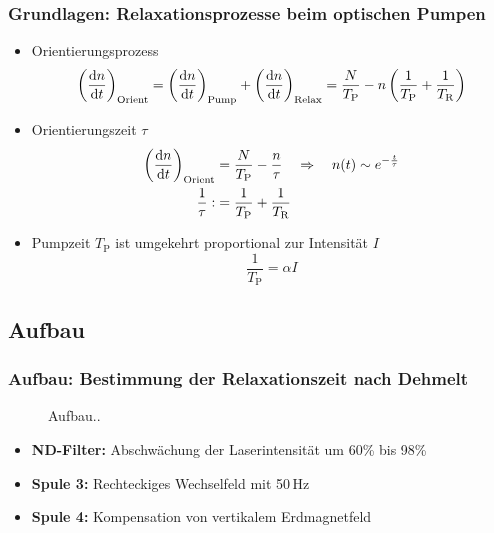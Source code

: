 \begin{frame}
\frametitle{Grundlagen: Relaxationsprozesse beim optischen Pumpen}
\begin{itemize}[<+->]
    \item Orientierungsprozess
    \begin{equation*}
        \left(\frac{\mathrm{d} n}{\mathrm{d} t}\right)_{\text{Orient}}
        =\left(\frac{\mathrm{d} n}{\mathrm{d} t}\right)_{\text{Pump}} + \left(\frac{\mathrm{d} n}{\mathrm{d} t}\right)_{\text{Relax}}
        =\frac{N}{T_\text{P}}-n \left( \frac{1}{T_\text{P}} + \frac{1}{T_\text{R}}\right)
    \end{equation*}
    \item Orientierungszeit $\tau$
    \begin{equation*}
        \begin{split}
            \left(\frac{\mathrm{d} n}{\mathrm{d} t}\right)_{\text{Orient}} &= \frac{N}{T_\text{P}}- \frac{n}{\tau} \quad \Rightarrow \quad n(t) \sim e^{-\frac{t}{\tau}} \\
            \frac{1}{\tau} :&= \frac{1}{T_\text{P}} + \frac{1}{T_\text{R}}
        \end{split}
    \end{equation*}
    \item Pumpzeit $T_\text{P}$ ist umgekehrt proportional zur Intensität $I$
    \begin{equation*}
        \frac{1}{T_\text{P}} = \alpha I
    \end{equation*}
\end{itemize}
\end{frame}



\subsection{Aufbau}
\begin{frame}
\frametitle{Aufbau: Bestimmung der Relaxationszeit nach Dehmelt}

\begin{figure}
    \centering
    \def\svgwidth{\textwidth}
    
    \caption{Aufbau..}
\end{figure}

\begin{itemize}
    \item \textbf{ND-Filter:} Abschwächung der Laserintensität um 60\% bis 98\%
    \item \textbf{Spule 3:} Rechteckiges Wechselfeld mit 50\,Hz
    \item \textbf{Spule 4:} Kompensation von vertikalem Erdmagnetfeld
\end{itemize}
\end{frame}

